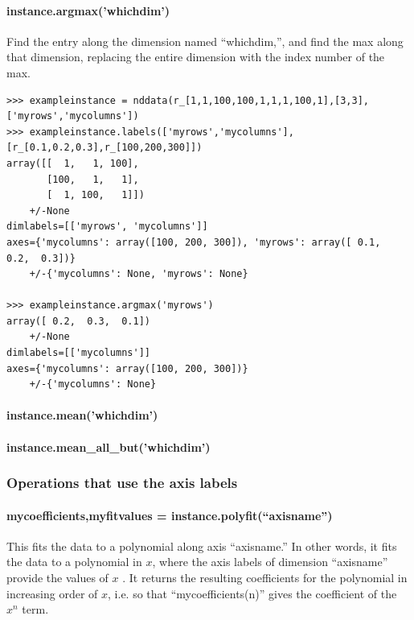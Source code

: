 \paragraph{instance.argmax('whichdim')}
Find the entry along the dimension named ``whichdim,'', and find the max along that dimension, replacing the entire dimension with the index number of the max.

\begin{lstlisting}
>>> exampleinstance = nddata(r_[1,1,100,100,1,1,1,100,1],[3,3],['myrows','mycolumns'])
>>> exampleinstance.labels(['myrows','mycolumns'],[r_[0.1,0.2,0.3],r_[100,200,300]])
array([[  1,   1, 100],
       [100,   1,   1],
       [  1, 100,   1]])
    +/-None
dimlabels=[['myrows', 'mycolumns']]
axes={'mycolumns': array([100, 200, 300]), 'myrows': array([ 0.1,  0.2,  0.3])}
    +/-{'mycolumns': None, 'myrows': None}

>>> exampleinstance.argmax('myrows')
array([ 0.2,  0.3,  0.1])
    +/-None
dimlabels=[['mycolumns']]
axes={'mycolumns': array([100, 200, 300])}
    +/-{'mycolumns': None}

\end{lstlisting}
\paragraph{instance.mean('whichdim')}
\paragraph{instance.mean\_all\_but('whichdim')}
\subsubsection{Operations that use the axis labels}
\paragraph{mycoefficients,myfitvalues = instance.polyfit(``axisname'')}
This fits the data to a polynomial along axis ``axisname.''
In other words, it fits the data to a polynomial in $x$, where
    the axis labels of dimension ``axisname'' provide the values
    of $x$ .
It returns the resulting coefficients for the polynomial in
    increasing order of $x$,
    i.e. so that ``mycoefficients(n)'' gives the coefficient of
    the $x^n$ term.


